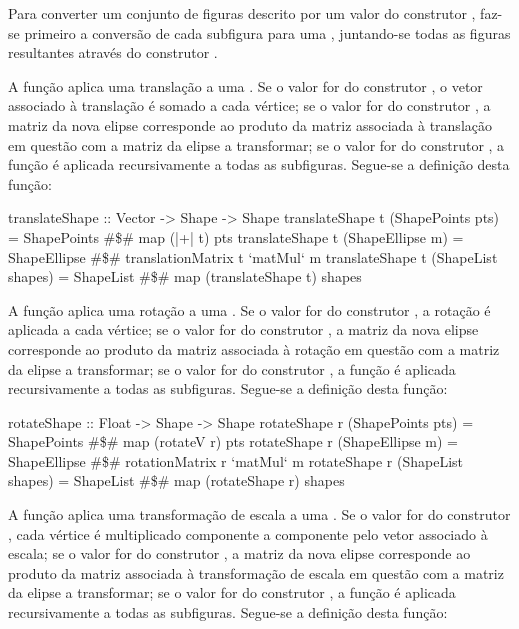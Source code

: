 \documentclass[a4paper]{article}
\begin{document}
Para converter um conjunto de figuras descrito por um valor do construtor , faz-se primeiro a conversão de cada subfigura para uma , juntando-se todas as figuras resultantes através do construtor .

\bigskip

A função  aplica uma translação a uma . Se o valor for do construtor , o vetor associado à translação é somado a cada vértice; se o valor for do construtor , a matriz da nova elipse corresponde ao produto da matriz associada à translação em questão com a matriz da elipse a transformar; se o valor for do construtor , a função é aplicada recursivamente a todas as subfiguras. Segue-se a definição desta função:

\begin{haskellblock}
translateShape :: Vector -> Shape -> Shape
translateShape t (ShapePoints pts)  = ShapePoints #\$# map (|+| t) pts
translateShape t (ShapeEllipse m)   = ShapeEllipse #\$# translationMatrix t `matMul` m
translateShape t (ShapeList shapes) = ShapeList #\$# map (translateShape t) shapes
\end{haskellblock}

A função  aplica uma rotação a uma . Se o valor for do construtor , a rotação é aplicada a cada vértice; se o valor for do construtor , a matriz da nova elipse corresponde ao produto da matriz associada à rotação em questão com a matriz da elipse a transformar; se o valor for do construtor , a função é aplicada recursivamente a todas as subfiguras. Segue-se a definição desta função:

\begin{haskellblock}
rotateShape :: Float -> Shape -> Shape
rotateShape r (ShapePoints pts)  = ShapePoints #\$# map (rotateV r) pts
rotateShape r (ShapeEllipse m)   = ShapeEllipse #\$# rotationMatrix r `matMul` m
rotateShape r (ShapeList shapes) = ShapeList #\$# map (rotateShape r) shapes
\end{haskellblock}

A função  aplica uma transformação de escala a uma . Se o valor for do construtor , cada vértice é multiplicado componente a componente pelo vetor associado à escala; se o valor for do construtor , a matriz da nova elipse corresponde ao produto da matriz associada à transformação de escala em questão com a matriz da elipse a transformar; se o valor for do construtor , a função é aplicada recursivamente a todas as subfiguras. Segue-se a definição desta função:
\end{document}

